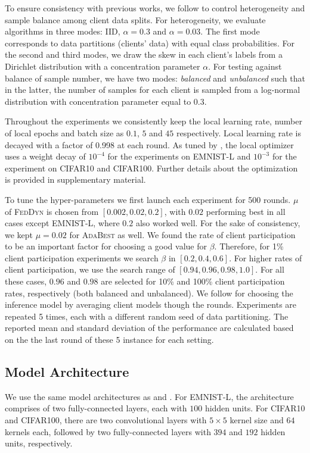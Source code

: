 \documentclass[runningheads]{llncs}
\newcommand{\feddyn}{\textsc{FedDyn}\xspace}
\newcommand{\ours}{\textsc{AdaBest}\xspace}
\def\cifart{{\textsc{CIFAR10}}}
\def\cifarh{{\textsc{CIFAR100}}}
\def\emnist{{\textsc{EMNIST-L}}}
\begin{document}
To ensure consistency with previous works, we follow \cite{acar2021federated} to control heterogeneity and sample balance among client data splits. For  heterogeneity, we evaluate algorithms in three modes: IID, $\alpha=0.3$ and $\alpha=0.03$. The first mode corresponds to data partitions (clients' data) with equal class probabilities. For the second and third modes, we draw the skew in each client's labels from a Dirichlet distribution with a concentration parameter $\alpha$.
For testing against balance of sample number, we have two modes: \emph{balanced} and \emph{unbalanced} such that in the latter, the number of samples for each client is sampled from a log-normal distribution with concentration parameter equal to $0.3$. 

Throughout the experiments we consistently keep the local learning rate, number of local epochs and batch size as $0.1$, $5$ and $45$ respectively. Local learning rate is decayed with a factor of 0.998 at each round. As tuned by \cite{acar2021federated}, the local optimizer uses a weight decay of $10^{-4}$ for the experiments on \emnist{} and $10^{-3}$ for the experiment on \cifart{} and \cifarh{}. Further details about the optimization is provided in supplementary material.

To tune the hyper-parameters we first launch each experiment for 500 rounds.
$\mu$ of \feddyn is chosen from $[0.002, 0.02, 0.2]$, with $0.02$ performing best in all cases except \emnist, where $0.2$ also worked well. For the sake of consistency, we kept $\mu=0.02$ for \ours as well. We found the rate of client participation to be an important factor for choosing a good value for $\beta$. Therefore, for 1\% client participation experiments we search $\beta$ in $[0.2, 0.4, 0.6]$. For higher rates of client participation, we use the search range of $[0.94, 0.96, 0.98, 1.0]$. For all these cases, $0.96$ and $0.98$ are selected for 10\% and 100\% client participation rates, respectively (both balanced and unbalanced).  
We follow \cite{acar2021federated} for choosing the inference model by averaging client models though the rounds.
Experiments are repeated 5 times, each with a different random seed of data partitioning. The reported mean and standard deviation of the performance are calculated based on the the last round of these 5 instance for each setting.

\subsection{Model Architecture}
We use the same model architectures as \cite{mcmahan2017communication} and \cite{acar2021federated}. For \emnist, the architecture comprises of two fully-connected layers, each with $100$ hidden units. For \cifart{} and \cifarh{}, there are two convolutional layers with $5\times 5$ kernel size and $64$ kernels each, followed by two fully-connected layers with $394$ and $192$ hidden units, respectively. 
\end{document}
